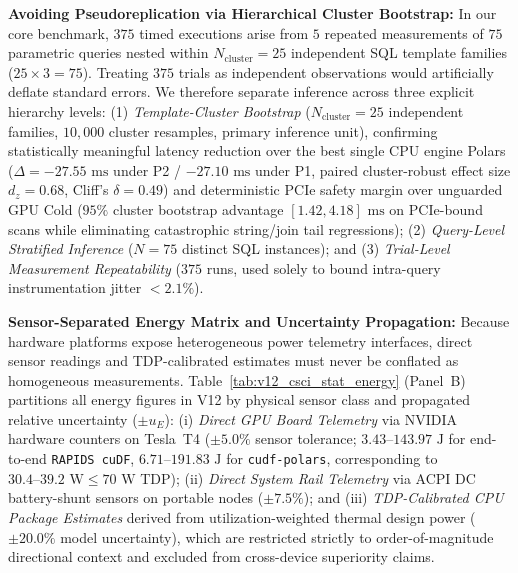 \documentclass[10pt,a4paper]{article}
\begin{document}
\noindent\textbf{Avoiding Pseudoreplication via Hierarchical Cluster Bootstrap:} In our core benchmark, $375$ timed executions arise from $5$ repeated measurements of $75$ parametric queries nested within $N_{\text{cluster}}=25$ independent SQL template families ($25 \times 3 = 75$). Treating $375$ trials as independent observations would artificially deflate standard errors. We therefore separate inference across three explicit hierarchy levels: (1) \emph{Template-Cluster Bootstrap} ($N_{\text{cluster}}=25$ independent families, $10{,}000$ cluster resamples, primary inference unit), confirming statistically meaningful latency reduction over the best single CPU engine Polars ($\Delta = -27.55\text{ ms}$ under P2 / $-27.10\text{ ms}$ under P1, paired cluster-robust effect size $d_{z} = 0.68$, Cliff's $\delta = 0.49$) and deterministic PCIe safety margin over unguarded GPU Cold ($95\%$ cluster bootstrap advantage $[1.42, 4.18]\text{ ms}$ on PCIe-bound scans while eliminating catastrophic string/join tail regressions); (2) \emph{Query-Level Stratified Inference} ($N=75$ distinct SQL instances); and (3) \emph{Trial-Level Measurement Repeatability} ($375$ runs, used solely to bound intra-query instrumentation jitter $< 2.1\%$).

\noindent\textbf{Sensor-Separated Energy Matrix and Uncertainty Propagation:} Because hardware platforms expose heterogeneous power telemetry interfaces, direct sensor readings and TDP-calibrated estimates must never be conflated as homogeneous measurements. Table~\ref{tab:v12_csci_stat_energy} (Panel~B) partitions all energy figures in V12 by physical sensor class and propagated relative uncertainty ($\pm u_{E}$): (i) \emph{Direct GPU Board Telemetry} via NVIDIA hardware counters on Tesla~T4 ($\pm 5.0\%$ sensor tolerance; $3.43\text{--}143.97\text{ J}$ for end-to-end \texttt{RAPIDS cuDF}, $6.71\text{--}191.83\text{ J}$ for \texttt{cudf-polars}, corresponding to $30.4\text{--}39.2\text{ W} \le 70\text{ W}$ TDP); (ii) \emph{Direct System Rail Telemetry} via ACPI DC battery-shunt sensors on portable nodes ($\pm 7.5\%$); and (iii) \emph{TDP-Calibrated CPU Package Estimates} derived from utilization-weighted thermal design power ($\pm 20.0\%$ model uncertainty), which are restricted strictly to order-of-magnitude directional context and excluded from cross-device superiority claims.
\end{document}
